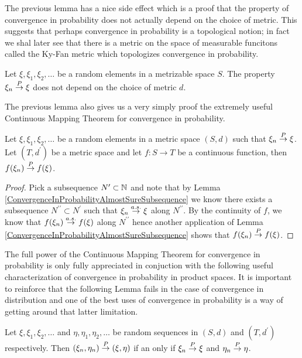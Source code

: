 The previous lemma has a nice side effect which is a proof that the
property of convergence in probability does not actually depend on the
choice of metric.  This suggests that perhaps convergence
in probability is a topological notion; in fact we shal later see that there is a metric on the space of measurable funcitons
called the Ky-Fan metric which topologizes convergence in probability.
\begin{cor}\label{ConvergenceInProbabilityIndependentOfMetric}Let $\xi, \xi_1, \xi_2, \dots$ be a random elements in a
  metrizable space $S$.  The property $\xi_n \overset{P}\to \xi$ does not
  depend on the choice of metric $d$.
\end{cor}

The previous lemma also gives us a very simply proof the extremely
useful Continuous Mapping Theorem for convergence in probability.
\begin{lem}\label{ContinuousMappingProbability}Let $\xi, \xi_1, \xi_2, \dots$ be a random elements in a
  metric space $(S,d)$ such that $\xi_n \overset{P}\to \xi$.  Let
  $(T,d^\prime)$ be a metric space and let $f : S \to
  T$ be a continuous function, then $f(\xi_n) \overset{P}\to f(\xi)$.
\end{lem}
\begin{proof}
Pick a subsequence $N^\prime \subset \mathbb{N}$ and note that by Lemma
\ref{ConvergenceInProbabilityAlmostSureSubsequence} we know there
exists a subsequence $N^{\prime \prime} \subset N^\prime$ such that
$\xi_n \overset{a.s.}\to \xi$ along $N^{\prime \prime}$.  By the continuity of $f$,
we know that $f(\xi_n) \overset{a.s.}\to f(\xi)$ along $N^{\prime \prime}$ hence
another application of Lemma
\ref{ConvergenceInProbabilityAlmostSureSubsequence}  shows that
$f(\xi_n) \overset{P}\to f(\xi)$.
\end{proof}
The full power of the Continuous Mapping Theorem for convergence in
probability is only fully appreciated in conjuction with the following
useful characterization of convergence in probability in product
spaces.  It is important to reinforce that the following Lemma fails
in the case of convergence in distribution and one of the best uses of
convergence in probability is a way of getting around that latter
limitation.
\begin{lem}\label{ConvergenceInProbabilityInProductSpaces}Let $\xi, \xi_1, \xi_2, \dots$ and $\eta, \eta_1, \eta_2,
  \dots$ be random sequences in $(S,d)$ and $(T,d^\prime)$
  respectively.  Then $(\xi_n, \eta_n) \overset{P}\to (\xi, \eta)$ if an only
  if $\xi_n \overset{P}\to \xi$ and $\eta_n \overset{P}\to \eta$.
\end{lem}
